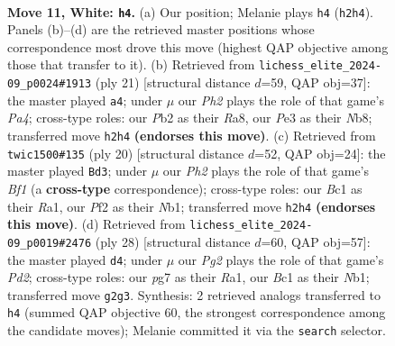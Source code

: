 \documentclass[11pt]{article}
\begin{document}
\clearpage

\begin{figure}[p]\centering
\begin{subfigure}{0.46\textwidth}\centering
\resizebox{\linewidth}{!}{%
\newchessgame
\chessboard[
  setfen={rnbkr3/1p3ppp/4pn2/p1b5/P7/1B2PN2/1P3PPP/RNB2RK1 w - - 0 11},
  showmover=false,
  pgfstyle=straightmove, color=movearrow, markmove={h2-h4}
]}
\caption{}
\end{subfigure}\hfill
\begin{subfigure}{0.46\textwidth}\centering
\resizebox{\linewidth}{!}{%
\newchessgame
\chessboard[
  setfen={rn3rk1/1p2bpp1/4bn1p/p2p4/3P1B2/2N5/PPP2PPP/2KR1BNR b - - 4 11},
  showmover=false,
  pgfstyle=straightmove, color=movearrow, markmove={a5-a4}
]}
\caption{}
\end{subfigure}
\\[4pt]
\begin{subfigure}{0.46\textwidth}\centering
\resizebox{\linewidth}{!}{%
\newchessgame
\chessboard[
  setfen={rnb1k2r/pp3ppp/3bp3/5n2/2P5/P4N2/1P3PPP/RNB1KB1R w KQkq - 0 11},
  showmover=false,
  pgfstyle=straightmove, color=movearrow, markmove={f1-d3}
]}
\caption{}
\end{subfigure}\hfill
\begin{subfigure}{0.46\textwidth}\centering
\resizebox{\linewidth}{!}{%
\newchessgame
\chessboard[
  setfen={r3kb1r/p3n2p/1np1bp2/4p1p1/4P3/P4N1P/1B1P1PP1/RN2KB1R w KQkq - 1 15},
  showmover=false,
  pgfstyle=straightmove, color=movearrow, markmove={d2-d4}
]}
\caption{}
\end{subfigure}
\caption{\textbf{Move 11, White: \texttt{h4}.} (a) Our position; Melanie plays \texttt{h4} (\texttt{h2h4}). Panels (b)--(d) are the retrieved master positions whose correspondence most drove this move (highest QAP objective among those that transfer to it). (b) Retrieved from \texttt{lichess\_elite\_2024-09\_p0024\#1913} (ply 21) [structural distance $d$=59, QAP obj=37]: the master played \texttt{a4}; under $\mu$ our \emph{Ph2} plays the role of that game's \emph{Pa4}; cross-type roles: our \emph{P}b2 as their \emph{R}a8, our \emph{P}e3 as their \emph{N}b8; transferred move \texttt{h2h4} \textbf{(endorses this move)}. (c) Retrieved from \texttt{twic1500\#135} (ply 20) [structural distance $d$=52, QAP obj=24]: the master played \texttt{Bd3}; under $\mu$ our \emph{Ph2} plays the role of that game's \emph{Bf1} (a \textbf{cross-type} correspondence); cross-type roles: our \emph{B}c1 as their \emph{R}a1, our \emph{P}f2 as their \emph{N}b1; transferred move \texttt{h2h4} \textbf{(endorses this move)}. (d) Retrieved from \texttt{lichess\_elite\_2024-09\_p0019\#2476} (ply 28) [structural distance $d$=60, QAP obj=57]: the master played \texttt{d4}; under $\mu$ our \emph{Pg2} plays the role of that game's \emph{Pd2}; cross-type roles: our \emph{p}g7 as their \emph{R}a1, our \emph{B}c1 as their \emph{N}b1; transferred move \texttt{g2g3}. Synthesis: 2 retrieved analogs transferred to \texttt{h4} (summed QAP objective 60, the strongest correspondence among the candidate moves); Melanie committed it via the \texttt{search} selector.}
\label{fig:thought-m20}
\end{figure}
\end{document}
